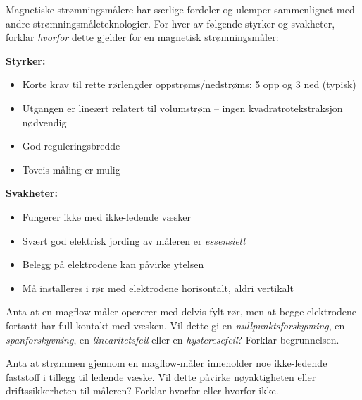 

Magnetiske strømningsmålere har særlige fordeler og ulemper sammenlignet med andre strømningsmåleteknologier. For hver av følgende styrker og svakheter, forklar \textit{hvorfor} dette gjelder for en magnetisk strømningsmåler:

\vskip 10pt

{\bf Styrker:}

\begin{itemize}
\item{} Korte krav til rette rørlengder oppstrøms/nedstrøms: 5 opp og 3 ned (typisk)
\item{} Utgangen er lineært relatert til volumstrøm -- ingen kvadratrotekstraksjon nødvendig
\item{} God reguleringsbredde
\item{} Toveis måling er mulig
\end{itemize}

\vskip 10pt

{\bf Svakheter:}

\begin{itemize}
\item{} Fungerer ikke med ikke-ledende væsker
\item{} Svært god elektrisk jording av måleren er \textit{essensiell}
\item{} Belegg på elektrodene kan påvirke ytelsen
\item{} Må installeres i rør med elektrodene horisontalt, aldri vertikalt
\end{itemize}

\vskip 10pt

Anta at en magflow-måler opererer med delvis fylt rør, men at begge elektrodene fortsatt har full kontakt med væsken. Vil dette gi en \textit{nullpunktsforskyvning}, en \textit{spanforskyvning}, en \textit{linearitetsfeil} eller en \textit{hysteresefeil}? Forklar begrunnelsen.

\vskip 10pt

Anta at strømmen gjennom en magflow-måler inneholder noe ikke-ledende faststoff i tillegg til ledende væske. Vil dette påvirke nøyaktigheten eller driftssikkerheten til måleren? Forklar hvorfor eller hvorfor ikke.

\vskip 10pt






